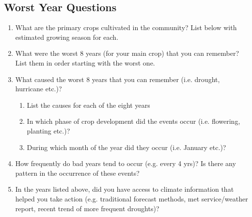 \documentclass[letterpaper,10pt,english]{sphinxmanual}
\begin{document}
\subsection{Worst Year Questions}
\label{games/initialvisitexercise_Ethiopia:worst-year-questions}\begin{enumerate}
\item {} 
What are the primary crops cultivated in the community? List below with estimated growing season for each.

\item {} 
What were the worst 8 years (for your main crop) that you can remember? List them in order starting with the worst one.

\item {} 
What caused the worst 8 years that you can remember (i.e. drought, hurricane etc.)?
\begin{enumerate}
\item {} 
List the causes for each of the eight years

\item {} 
In which phase of crop development did the events occur (i.e. flowering, planting etc.)?

\item {} 
During which month of the year did they occur (i.e. January etc.)?

\end{enumerate}

\item {} 
How frequently do bad years tend to occur (e.g. every 4 yrs)? Is there any pattern in the occurrence of these events?

\item {} 
In the years listed above, did you have access to climate information that helped you take action (e.g. traditional forecast methods, met service/weather report, recent trend of more frequent droughts)?

\end{enumerate}
\end{document}

